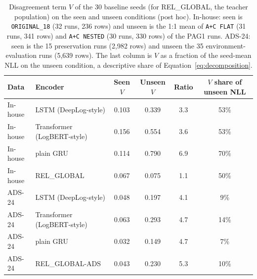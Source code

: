 \begin{table}[htbp]
\centering
\caption[Disagreement term $V$ on the seen and unseen conditions]{Disagreement term $V$ of the 30 baseline seeds (for REL\_GLOBAL, the teacher population) on the seen and
unseen conditions (post hoc). In-house: seen is \texttt{ORIGINAL\_18}
(32 runs, 236 rows) and unseen is the 1:1 mean of \texttt{A+C FLAT}
(31 runs, 341 rows) and \texttt{A+C NESTED} (30 runs, 330 rows) of the
PAG1 runs. ADS-24: seen is the 15 preservation runs (2,982 rows) and
unseen the 35 environment-evaluation runs (5,639 rows). The last column
is $V$ as a fraction of the seed-mean NLL on the unseen condition, a
descriptive share of Equation~\ref{eq:decomposition}.}
\label{tab:decomposition}
\small
\begin{tabular}{@{}llcccc@{}}
\toprule
Data & Encoder & Seen $V$ & Unseen $V$ & Ratio & $V$ share of unseen NLL \\
\midrule
In-house & LSTM (DeepLog-style)        & 0.103 & 0.339 & 3.3 & 53\% \\
In-house & Transformer (LogBERT-style) & 0.156 & 0.554 & 3.6 & 53\% \\
In-house & plain GRU                   & 0.114 & 0.790 & 6.9 & 70\% \\
In-house & REL\_GLOBAL                 & 0.067 & 0.075 & 1.1 & 50\% \\
\midrule
ADS-24 & LSTM (DeepLog-style)          & 0.048 & 0.197 & 4.1 &  9\% \\
ADS-24 & Transformer (LogBERT-style)   & 0.063 & 0.293 & 4.7 & 14\% \\
ADS-24 & plain GRU                     & 0.032 & 0.149 & 4.7 &  7\% \\
ADS-24 & REL\_GLOBAL-ADS               & 0.043 & 0.230 & 5.3 & 10\% \\
\bottomrule
\end{tabular}
\end{table}

